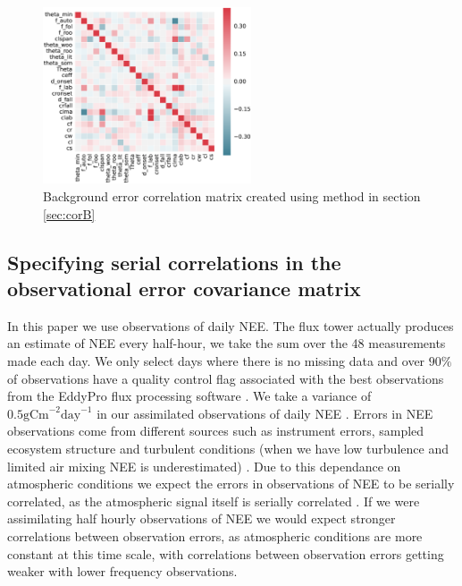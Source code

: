 \documentclass[11pt]{article}
\begin{document}
\begin{figure}[ht]
    \centering
    \includegraphics[width=0.55\textwidth]{edccorb.eps}
    \caption{Background error correlation matrix created using method in section \ref{sec:corB}}
    \label{fig:Bcorr}
\end{figure}

\subsection{Specifying serial correlations in the observational error covariance matrix} \label{sec:corR}

In this paper we use observations of daily NEE. The flux tower actually produces an estimate of NEE every half-hour, we take the sum over the 48 measurements made each day. We only select days where there is no missing data and over $90\% $ of observations have a quality control flag associated with the best observations from the EddyPro flux processing software \citep{eddypro}. We take a variance of $0.5\text{gCm}^{-2}\text{day}^{-1}$ in our assimilated observations of daily NEE \citep{williams2005improved}. Errors in NEE observations come from different sources such as instrument errors, sampled ecosystem structure and turbulent conditions (when we have low turbulence and limited air mixing NEE is underestimated) \citep{Papale2006}. Due to this dependance on atmospheric conditions we expect the errors in observations of NEE to be serially correlated, as the atmospheric signal itself is serially correlated \citep{Daley1992}. If we were assimilating half hourly observations of NEE we would expect stronger correlations between observation errors, as atmospheric conditions are more constant at this time scale, with correlations between observation errors getting weaker with lower frequency observations. 
\end{document}
